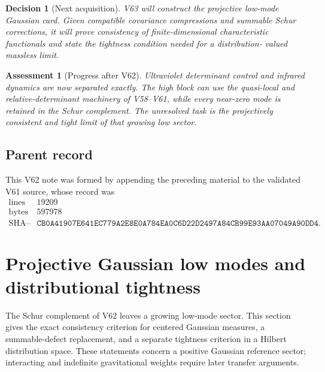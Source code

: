 \documentclass[11pt]{article}
\newtheorem{assessment}[theorem]{Assessment}
\newtheorem{decision}[theorem]{Decision}
\begin{document}
\begin{decision}[Next acquisition]
\label{dec:v11v62-next}
V63 will construct the projective low-mode Gaussian card.  Given
compatible covariance compressions and summable Schur corrections, it
will prove consistency of finite-dimensional characteristic
functionals and state the tightness condition needed for a distribution-
valued massless limit.
\end{decision}

\begin{assessment}[Progress after V62]
\label{ass:v11v62-status}
Ultraviolet determinant control and infrared dynamics are now
separated exactly.  The high block can use the quasi-local and
relative-determinant machinery of V58--V61, while every near-zero mode
is retained in the Schur complement.  The unresolved task is the
projectively consistent and tight limit of that growing low sector.
\end{assessment}

\subsection{Parent record}

This V62 note was formed by appending the preceding material to the
validated V61 source, whose record was
\[
\begin{array}{c|c}
\text{lines}&19209\\
\text{bytes}&597978\\
\text{SHA--256}&
\texttt{CB0A41907E641EC779A2E8E0A784EA0C6D22D2497A84CB99E93AA07049A90DD4}.
\end{array}                                                     \tag{62.20}
\]


\section{Projective Gaussian low modes and distributional tightness}
\label{sec:v11v63}

The Schur complement of V62 leaves a growing low-mode sector.  This
section gives the exact consistency criterion for centered Gaussian
measures, a summable-defect replacement, and a separate tightness
criterion in a Hilbert distribution space.  These statements concern
a positive Gaussian reference sector; interacting and indefinite
gravitational weights require later transfer arguments.
\end{document}
